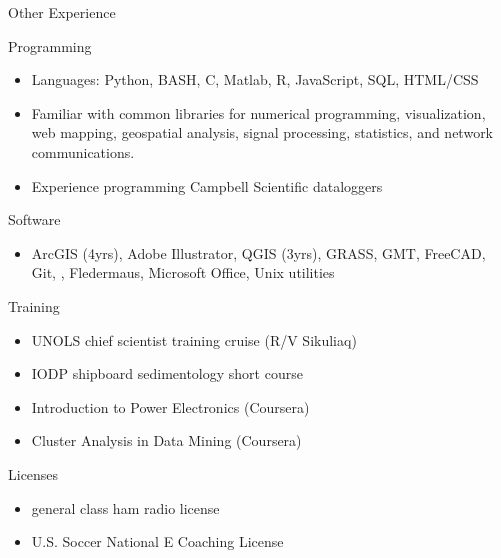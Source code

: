 \begin{cvlist}{Other Experience}
\item[Programming]
    \begin{itemize}
        \item Languages: Python, BASH, C, Matlab, R, JavaScript, SQL, HTML/CSS
        \item Familiar with common libraries for numerical programming, visualization,
            web mapping, geospatial analysis, signal processing, statistics, and network communications. 
        \item Experience programming Campbell Scientific dataloggers
    \end{itemize}

\item[Software]
    \begin{itemize}
        \item ArcGIS (4yrs), Adobe Illustrator, QGIS (3yrs), GRASS, GMT, FreeCAD, Git, \Latex, Fledermaus, Microsoft Office, Unix utilities
    \end{itemize}

\item[Training] 
    \begin{itemize}
        \item UNOLS chief scientist training cruise (R/V Sikuliaq)
        \item IODP shipboard sedimentology short course
        \item Introduction to Power Electronics (Coursera)
        \item Cluster Analysis in Data Mining (Coursera)
    \end{itemize}

\item[Licenses]
    \begin{itemize}
        \item general class ham radio license
        \item U.S. Soccer National E Coaching License 
    \end{itemize}
\end{cvlist}
